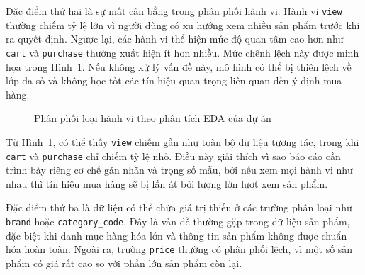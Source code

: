 Đặc điểm thứ hai là sự mất cân bằng trong phân phối hành vi. Hành vi \colorbox{gray!15}{\texttt{view}} thường chiếm tỷ lệ lớn vì người dùng có xu hướng xem nhiều sản phẩm trước khi ra quyết định. Ngược lại, các hành vi thể hiện mức độ quan tâm cao hơn như \colorbox{gray!15}{\texttt{cart}} và \colorbox{gray!15}{\texttt{purchase}} thường xuất hiện ít hơn nhiều. Mức chênh lệch này được minh họa trong Hình~\ref{fig:event_distribution}. Nếu không xử lý vấn đề này, mô hình có thể bị thiên lệch về lớp đa số và không học tốt các tín hiệu quan trọng liên quan đến ý định mua hàng.

\begin{figure}[H]
\centering
{}
\caption{Phân phối loại hành vi theo phân tích EDA của dự án}
\label{fig:event_distribution}
\end{figure}

Từ Hình~\ref{fig:event_distribution}, có thể thấy \colorbox{gray!15}{\texttt{view}} chiếm gần như toàn bộ dữ liệu tương tác, trong khi \colorbox{gray!15}{\texttt{cart}} và \colorbox{gray!15}{\texttt{purchase}} chỉ chiếm tỷ lệ nhỏ. Điều này giải thích vì sao báo cáo cần trình bày riêng cơ chế gán nhãn và trọng số mẫu, bởi nếu xem mọi hành vi như nhau thì tín hiệu mua hàng sẽ bị lấn át bởi lượng lớn lượt xem sản phẩm.
\medskip

Đặc điểm thứ ba là dữ liệu có thể chứa giá trị thiếu ở các trường phân loại như \texttt{brand} hoặc \texttt{category\_code}. Đây là vấn đề thường gặp trong dữ liệu sản phẩm, đặc biệt khi danh mục hàng hóa lớn và thông tin sản phẩm không được chuẩn hóa hoàn toàn. Ngoài ra, trường \texttt{price} thường có phân phối lệch, vì một số sản phẩm có giá rất cao so với phần lớn sản phẩm còn lại.

